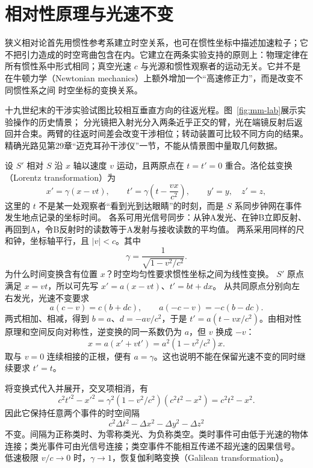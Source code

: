 \section{相对性原理与光速不变}

狭义相对论首先用惯性参考系建立时空关系，也可在惯性坐标中描述加速粒子；它不把引力造成的时空弯曲包含在内。它建立在两条实验支持的原则上：物理定律在所有惯性系中形式相同；真空光速
$c$ 与光源和惯性观察者的运动无关。它并不是在牛顿力学（Newtonian mechanics）上额外增加一个“高速修正力”，而是改变不同惯性系之间
时空坐标的变换关系。

十九世纪末的干涉实验试图比较相互垂直方向的往返光程。图~\ref{fig:mm-lab}展示实验操作的历史情景；
分光镜把入射光分入两条近乎正交的臂，光在端镜反射后返回并合束。两臂的往返时间差会改变干涉相位；转动装置可比较不同方向的结果。
精确光路见第29章“迈克耳孙干涉仪”一节，不能从情景图中量取几何数据。

设 $S'$ 相对 $S$ 沿 $x$ 轴以速度 $v$ 运动，且两原点在 $t=t'=0$ 重合。洛伦兹变换（Lorentz transformation）为
\begin{equation}
 x'=\gamma(x-vt),\qquad
 t'=\gamma\left(t-\frac{vx}{c^2}\right),
 \qquad y'=y,\quad z'=z,
\end{equation}
这里的 $t$ 不是某一处观察者“看到光到达眼睛”的时刻，而是 $S$ 系同步钟网在事件发生地点记录的坐标时间。
各系可用光信号同步：从钟A发光、在钟B立即反射、再回到A，令B反射时的读数等于A发射与接收读数的平均值。
两系采用同样的尺和钟，坐标轴平行，且 $|v|<c$。其中
\begin{equation}
 \gamma=\frac1{\sqrt{1-v^2/c^2}}.
\end{equation}
为什么时间变换含有位置 $x$？时空均匀性要求惯性坐标之间为线性变换。
$S'$ 原点满足 $x=vt$，所以可先写 $x'=a(x-vt)$、$t'=bt+dx$。
从共同原点分别向左右发光，光速不变要求
\[
 a(c-v)=c(b+dc),\qquad a(-c-v)=-c(b-dc).
\]
两式相加、相减，得到 $b=a$、$d=-av/c^2$，于是
$t'=a(t-vx/c^2)$。由相对性原理和空间反向对称性，逆变换的同一系数仍为 $a$，但 $v$ 换成 $-v$：
\[
 x=a(x'+vt')=a^2(1-v^2/c^2)x.
\]
取与 $v=0$ 连续相接的正根，便有 $a=\gamma$。这也说明不能在保留光速不变的同时继续要求 $t'=t$。

将变换式代入并展开，交叉项相消，有
\[
 c^2t'^2-x'^2=\gamma^2(1-v^2/c^2)(c^2t^2-x^2)=c^2t^2-x^2.
\]
因此它保持任意两个事件的时空间隔
\begin{equation}
 c^2\Delta t^2-\Delta x^2-\Delta y^2-\Delta z^2
\end{equation}
不变。间隔为正称类时、为零称类光、为负称类空。类时事件可由低于光速的物体连接；类光事件可由光信号连接；类空事件不能相互传递不超光速的因果信号。
低速极限 $v/c\to0$ 时，$\gamma\to1$，恢复伽利略变换（Galilean transformation）。


